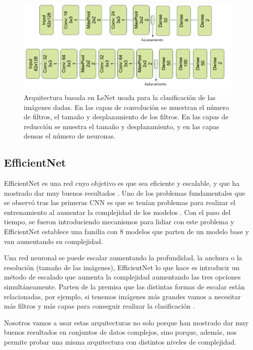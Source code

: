\documentclass[a4paper,12pt,oneside,titlepage]{book}
\begin{document}
\begin{figure}[h!]
  \centering
  \includegraphics[scale=0.85, center]{lenet.PNG}
  \caption{Arquitectura basada en LeNet usada para la clasificación de las imágenes dadas. En las capas de convolución se muestran el número de filtros, el tamaño y desplazamiento de los filtros. En las capas de reducción se muestra el tamaño y desplazamiento, y en las capas densas el número de neuronas.}
  \label{fig:lenet}
\end{figure}

\subsection*{EfficientNet}

EfficientNet es una red cuyo objetivo es que sea eficiente y escalable, y que ha mostrado dar muy buenos resultados \cite{enet}. Uno de los problemas fundamentales que se observó tras las primeras CNN es que se tenían problemas para realizar el entrenamiento al aumentar la complejidad de los modelos \cite{resnet}. Con el paso del tiempo, se fueron introduciendo mecanismos para lidiar con este problema y EfficientNet establece una familia con 8 modelos que parten de un modelo base y van aumentando su complejidad.
 
Una red neuronal se puede escalar aumentando la profundidad, la anchura o la resolución (tamaño de las imágenes), EfficientNet lo que hace es introducir un método de escalado que aumenta la complejidad aumentando las tres opciones simultáneamente. Parten de la premisa que las distintas formas de escalar están relacionadas, por ejemplo, si tenemos imágenes más grandes vamos a necesitar más filtros y más capas para conseguir realizar la clasificación \cite{enet}.


Nosotros vamos a usar estas arquitecturas no solo porque han mostrado dar muy buenos resultados en conjuntos de datos complejos, sino porque, además, nos permite probar una misma arquitectura con distintos niveles de complejidad.
\end{document}
